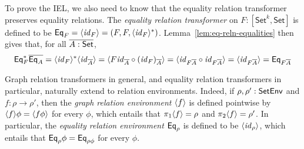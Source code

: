 \documentclass{lmcs}
\theoremstyle{plain}\newtheorem{satz}[thm]{Satz}
\newcommand{\set}{\mathsf{Set}}
\renewcommand{\id}{\mathit{id}}
\begin{document}
To prove the IEL, we also need to know that the equality relation
transformer preserves equality relations.  The {\em equality relation
  transformer} on $F : [\set^k,\set]$ is defined to be $\Eq_F =
\graph{\id_{F}} = (F, F, \graph{\id_{F}}^*)$.
Lemma~\ref{lem:eq-reln-equalities} then gives that, for all $\ol{A :
\set}$,
\begin{equation}\label{eq:eq-pres-eq}
\Eq^*_F \ol{\Eq_A}
= \graph{\id_F}^* \graph{\id_{\ol{A}}}
= \graph{F \id_{\ol{A}} \circ (\id_F)_{\ol{A}}}
= \graph{\id_{F\ol{A}} \circ \id_{F\ol{A}}}
= \graph{\id_{F\ol{A}}}
= \Eq_{F\ol{A}}
\end{equation}

Graph relation transformers in general, and equality relation
transformers in particular, naturally extend to relation environments.
Indeed, if $\rho, \rho' : \mathsf{SetEnv}$ and $f : \rho \to \rho'$, then the
{\em graph relation environment} $\langle {f} \rangle$ is defined pointwise by
$\langle {f} \rangle \phi = \langle {f \phi} \rangle$ for every $\phi$, which entails that
$\pi_1 \langle {f} \rangle = \rho$ and $\pi_2 \langle {f} \rangle = \rho'$. In particular,
the {\em equality relation environment} $\mathsf{Eq}_\rho$ is defined to be
$\graph{\id_{\rho}}$, which entails that $\mathsf{Eq}_\rho \phi = \mathsf{Eq}_{\rho
  \phi}$ for every $\phi$.
\end{document}
